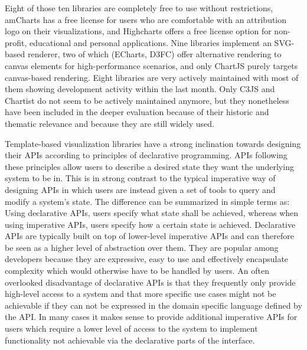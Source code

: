 Eight of those ten libraries are completely free to use without restrictions, amCharts has a free license for users who are comfortable with an attribution logo on their visualizations, and Highcharts offers a free license option for non-profit, educational and personal applications.
Nine libraries implement an SVG-based renderer, two of which (ECharts, D3FC) offer alternative rendering to canvas elements for high-performance scenarios, and only ChartJS purely targets canvas-based rendering.
Eight libraries are very actively maintained with most of them showing development activity within the last month.
Only C3JS and Chartist do not seem to be actively maintained anymore, but they nonetheless have been included in the deeper evaluation because of their historic and thematic relevance and because they are still widely used.

Template-based visualization libraries have a strong inclination towards designing their APIs according to principles of declarative programming.
APIs following these principles allow users to describe a desired state they want the underlying system to be in.
This is in strong contrast to the typical imperative way of designing APIs in which users are instead given a set of tools to query and modify a system's state.
The difference can be summarized in simple terms as: Using declarative APIs, users specify what state shall be achieved, whereas when using imperative APIs, users specify how a certain state is achieved.
Declarative APIs are typically built on top of lower-level imperative APIs and can therefore be seen as a higher level of abstraction over them.
They are popular among developers because they are expressive, easy to use and effectively encapsulate complexity which would otherwise have to be handled by users.
An often overlooked disadvantage of declarative APIs is that they frequently only provide high-level access to a system and that more specific use cases might not be achievable if they can not be expressed in the domain specific language defined by the API.
In many cases it makes sense to provide additional imperative APIs for users which require a lower level of access to the system to implement functionality not achievable via the declarative parts of the interface.

